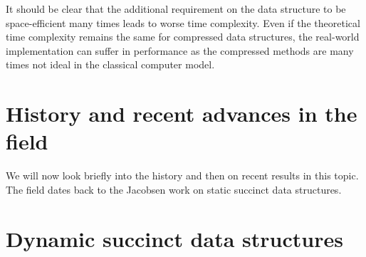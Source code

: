 It should be clear that the additional requirement on the data structure to be space-efficient many times leads to worse time complexity. Even if the theoretical time complexity remains the same for compressed data structures, the real-world implementation can suffer in performance as the compressed methods are many times not ideal in the classical computer model.

\section{History and recent advances in the field}

We will now look briefly into the history and then on recent results in this topic. The field dates back to the Jacobsen work on static succinct data structures.

\section{Dynamic succinct data structures}

